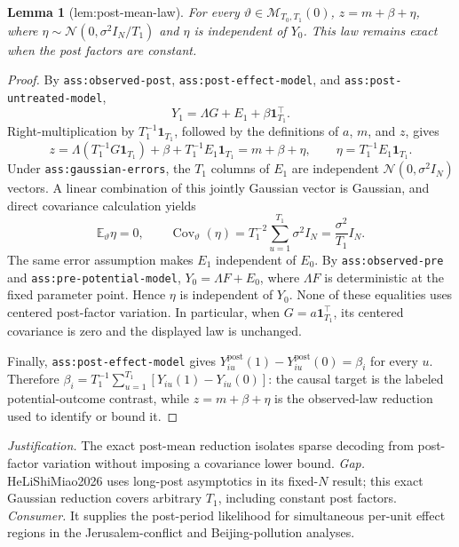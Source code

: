\documentclass{article}
\newtheorem{lemma}{Lemma}
\begin{document}
\begin{lemma}[lem:post-mean-law]\label{lem:post-mean-law}
For every \(\vartheta\in\mathcal M_{T_0,T_1}(0)\), \(z=m+\beta+\eta\), where \(\eta\sim\mathcal N(0,\sigma^2I_N/T_1)\) and \(\eta\) is independent of \(Y_0\). This law remains exact when the post factors are constant.
\end{lemma}
\begin{proof}
By \texttt{ass:observed-post}, \texttt{ass:post-effect-model}, and \texttt{ass:post-untreated-model},
\[
 Y_1=\Lambda G+E_1+\beta\mathbf 1_{T_1}^{\top}.
\]
Right-multiplication by \(T_1^{-1}\mathbf 1_{T_1}\), followed by the definitions of \(a\), \(m\), and \(z\), gives
\[
 z=\Lambda\left(T_1^{-1}G\mathbf 1_{T_1}\right)+\beta
      +T_1^{-1}E_1\mathbf 1_{T_1}
   =m+\beta+\eta,
 \qquad
 \eta=T_1^{-1}E_1\mathbf 1_{T_1}.
\]
Under \texttt{ass:gaussian-errors}, the \(T_1\) columns of \(E_1\) are independent \(\mathcal N(0,\sigma^2I_N)\) vectors.  A linear combination of this jointly Gaussian vector is Gaussian, and direct covariance calculation yields
\[
 \mathbb E_\vartheta\eta=0,
 \qquad
 \operatorname{Cov}_\vartheta(\eta)
 =T_1^{-2}\sum_{u=1}^{T_1}\sigma^2I_N
 =\frac{\sigma^2}{T_1}I_N.
\]
The same error assumption makes \(E_1\) independent of \(E_0\).  By \texttt{ass:observed-pre} and \texttt{ass:pre-potential-model}, \(Y_0=\Lambda F+E_0\), where \(\Lambda F\) is deterministic at the fixed parameter point.  Hence \(\eta\) is independent of \(Y_0\).  None of these equalities uses centered post-factor variation.  In particular, when \(G=a\mathbf 1_{T_1}^{\top}\), its centered covariance is zero and the displayed law is unchanged.

Finally, \texttt{ass:post-effect-model} gives \(Y_{iu}^{\mathrm{post}}(1)-Y_{iu}^{\mathrm{post}}(0)=\beta_i\) for every \(u\).  Therefore \(\beta_i=T_1^{-1}\sum_{u=1}^{T_1}[Y_{iu}(1)-Y_{iu}(0)]\): the causal target is the labeled potential-outcome contrast, while \(z=m+\beta+\eta\) is the observed-law reduction used to identify or bound it.
\end{proof}
\par\smallskip\noindent \textit{Justification.} The exact post-mean reduction isolates sparse decoding from post-factor variation without imposing a covariance lower bound. \textit{Gap.} HeLiShiMiao2026 uses long-post asymptotics in its fixed-\(N\) result; this exact Gaussian reduction covers arbitrary \(T_1\), including constant post factors. \textit{Consumer.} It supplies the post-period likelihood for simultaneous per-unit effect regions in the Jerusalem-conflict and Beijing-pollution analyses.
\end{document}
